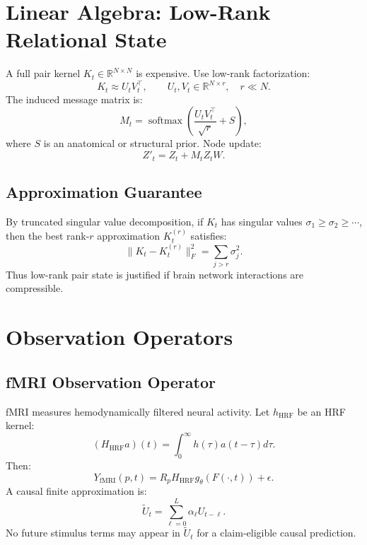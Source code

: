 \documentclass[11pt]{article}
\newcommand{\R}{\mathbb{R}}
\newcommand{\softmax}{\operatorname{softmax}}
\begin{document}
\section{Linear Algebra: Low-Rank Relational State}

A full pair kernel $K_t\in\R^{N\times N}$ is expensive. Use low-rank factorization:
\begin{equation}
K_t\approx U_tV_t^\top,
\qquad U_t,V_t\in\R^{N\times r}, \quad r\ll N.
\end{equation}
The induced message matrix is:
\begin{equation}
M_t = \softmax\left(\frac{U_tV_t^\top}{\sqrt{r}} + S\right),
\end{equation}
where $S$ is an anatomical or structural prior. Node update:
\begin{equation}
Z'_t = Z_t + M_t Z_t W.
\end{equation}

\subsection{Approximation Guarantee}

By truncated singular value decomposition, if $K_t$ has singular values $\sigma_1\geq\sigma_2\geq\cdots$, then the best rank-$r$ approximation $K_t^{(r)}$ satisfies:
\begin{equation}
\|K_t-K_t^{(r)}\|_F^2=\sum_{j>r}\sigma_j^2.
\end{equation}
Thus low-rank pair state is justified if brain network interactions are compressible.

\section{Observation Operators}

\subsection{fMRI Observation Operator}

fMRI measures hemodynamically filtered neural activity. Let $h_{\mathrm{HRF}}$ be an HRF kernel:
\begin{equation}
(H_{\mathrm{HRF}}a)(t)=\int_0^\infty h(\tau)a(t-\tau)d\tau.
\end{equation}
Then:
\begin{equation}
Y_{\mathrm{fMRI}}(p,t)=R_pH_{\mathrm{HRF}}g_\theta(F(\cdot,t))+\epsilon.
\end{equation}
A causal finite approximation is:
\begin{equation}
\tilde{U}_t=\sum_{\ell=0}^{L}\alpha_\ell U_{t-\ell}.
\end{equation}
No future stimulus terms may appear in $\tilde{U}_t$ for a claim-eligible causal prediction.
\end{document}
